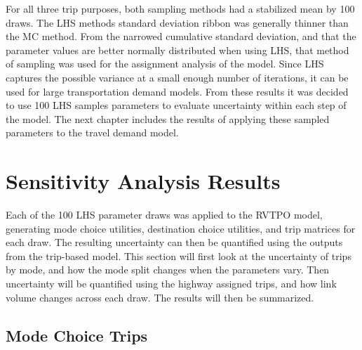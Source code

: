\documentclass[
  letterpaper,
  authoryear,
  review,
  3p]{elsarticle}
\begin{document}
For all three trip purposes, both sampling methods had a stabilized mean
by 100 draws. The LHS methods standard deviation ribbon was generally
thinner than the MC method. From the narrowed cumulative standard
deviation, and that the parameter values are better normally distributed
when using LHS, that method of sampling was used for the assignment
analysis of the model. Since LHS captures the possible variance at a
small enough number of iterations, it can be used for large
transportation demand models. From these results it was decided to use
100 LHS samples parameters to evaluate uncertainty within each step of
the model. The next chapter includes the results of applying these
sampled parameters to the travel demand model.


\hypertarget{sec-results}{%
\section{Sensitivity Analysis Results}\label{sec-results}}

Each of the 100 LHS parameter draws was applied to the RVTPO model,
generating mode choice utilities, destination choice utilities, and trip
matrices for each draw. The resulting uncertainty can then be quantified
using the outputs from the trip-based model. This section will first
look at the uncertainty of trips by mode, and how the mode split changes
when the parameters vary. Then uncertainty will be quantified using the
highway assigned trips, and how link volume changes across each draw.
The results will then be summarized.

\hypertarget{mode-choice-trips}{%
\subsection{Mode Choice Trips}\label{mode-choice-trips}}
\end{document}
